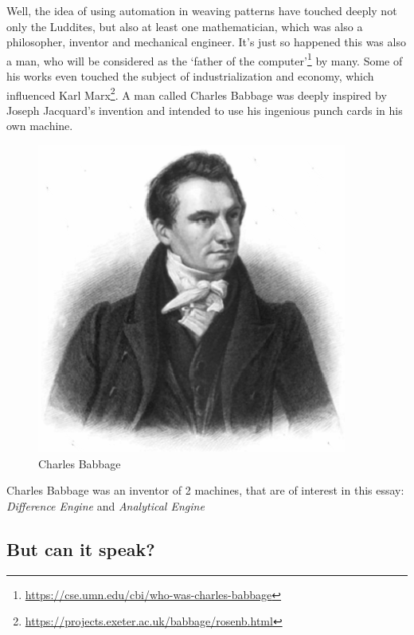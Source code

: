 \documentclass{article}
\begin{document}
            Well, the idea of using automation in weaving patterns have touched deeply not only the Luddites, but also at least one mathematician, which was also a philosopher,
            inventor and mechanical engineer. It's just so happened this was also a man, who will be considered as the `father of the computer'\footnote{\href{https://cse.umn.edu/cbi/who-was-charles-babbage}
            {https://cse.umn.edu/cbi/who-was-charles-babbage}} by many. Some of his works even touched the subject of industrialization and economy, which influenced Karl 
            Marx\footnote{\href{https://projects.exeter.ac.uk/babbage/rosenb.html}{https://projects.exeter.ac.uk/babbage/rosenb.html}}. A man called Charles Babbage was deeply
            inspired by Joseph Jacquard's invention and intended to use his ingenious punch cards in his own machine. \par

            \begin{figure}
                \centering
                \includegraphics[scale=0.3]{images/persons/person_charles_babbage.png}
                \caption{Charles Babbage}
            \end{figure}

            Charles Babbage was an inventor of 2 machines, that are of interest in this essay: \emph{Difference Engine} and \emph{Analytical Engine}

            

            \newpage
        \subsection{But can it speak?}
            \newpage


        

        

    
\end{document}
